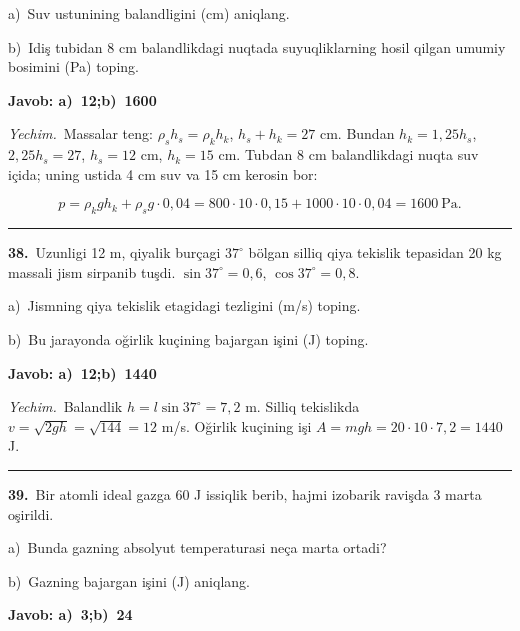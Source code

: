 \documentclass[11pt,a4paper]{article}
\begin{document}
\noindent\hspace*{4mm}a)\ Suv ustunining balandligini (cm) aniqlang.\par
\noindent\hspace*{4mm}b)\ Idiş tubidan 8 cm balandlikdagi nuqtada suyuqliklarning hosil qilgan umumiy bosimini (Pa) toping.\par
\noindent\colorbox{gray!12}{\parbox{\dimexpr\linewidth-2\fboxsep}{\textbf{Javob: a)\ 12;\quad b)\ 1600}}}\par\smallskip
\noindent\textit{Yechim.}\ Massalar teng: $\rho_s h_s=\rho_k h_k$, $h_s+h_k=27$ cm. Bundan $h_k=1{,}25h_s$, $2{,}25h_s=27$, $h_s=12$ cm, $h_k=15$ cm. Tubdan 8 cm balandlikdagi nuqta suv içida; uning ustida 4 cm suv va 15 cm kerosin bor:\par
\[p=\rho_k g h_k+\rho_s g\cdot0{,}04=800\cdot10\cdot0{,}15+1000\cdot10\cdot0{,}04=1600\ \text{Pa}.\]\par\medskip\hrule\medskip
{}\noindent\textbf{38.}\ Uzunligi 12 m, qiyalik burçagi $37^\circ$ bölgan silliq qiya tekislik tepasidan 20 kg massali jism sirpanib tuşdi. $\sin37^\circ=0,6$, $\cos37^\circ=0,8$.\par
\noindent\hspace*{4mm}a)\ Jismning qiya tekislik etagidagi tezligini (m/s) toping.\par
\noindent\hspace*{4mm}b)\ Bu jarayonda oğirlik kuçining bajargan işini (J) toping.\par
\noindent\colorbox{gray!12}{\parbox{\dimexpr\linewidth-2\fboxsep}{\textbf{Javob: a)\ 12;\quad b)\ 1440}}}\par\smallskip
\noindent\textit{Yechim.}\ Balandlik $h=l\sin37^\circ=7{,}2$ m. Silliq tekislikda $v=\sqrt{2gh}=\sqrt{144}=12$ m/s. Oğirlik kuçining işi $A=mgh=20\cdot10\cdot7{,}2=1440$ J.\par\par\medskip\hrule\medskip
{}\noindent\textbf{39.}\ Bir atomli ideal gazga 60 J issiqlik berib, hajmi izobarik ravişda 3 marta oşirildi.\par
\noindent\hspace*{4mm}a)\ Bunda gazning absolyut temperaturasi neça marta ortadi?\par
\noindent\hspace*{4mm}b)\ Gazning bajargan işini (J) aniqlang.\par
\noindent\colorbox{gray!12}{\parbox{\dimexpr\linewidth-2\fboxsep}{\textbf{Javob: a)\ 3;\quad b)\ 24}}}\par\smallskip
\end{document}
